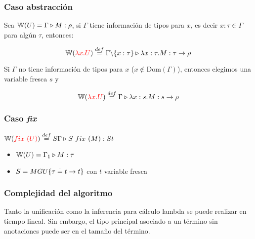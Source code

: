 \subsubsection{Caso abstracción}
Sea $\mathbb{W}(U) = \Gamma\triangleright M : \rho$, si $\Gamma$ tiene información de tipos para $x$, es decir $x:\tau\in\Gamma$ para algún $\tau$, entonces:

$$\mathbb{W}({\color{red}\lambda x. U}) \overset{def}{=} \Gamma \backslash\{x:\tau\}\triangleright \lambda x: \tau . M : \tau\to\rho$$

Si $\Gamma$ no tiene información de tipos para $x$ ($x\notin \text{Dom}(\Gamma)$), entonces elegimos una variable fresca $s$ y

$$\mathbb{W}({\color{red}\lambda x. U}) \overset{def}{=} \Gamma\triangleright \lambda x: s . M : s\to\rho$$

\subsubsection{Caso \textit{fix}}
$\mathbb{W}({\color{red}fix~(U)}) \overset{def}{=} S\Gamma\triangleright S~fix~(M) : St$
\begin{centrado}
\begin{itemize}
\item $\mathbb{W}(U) = \Gamma_1\triangleright M : \tau$
\item $S = MGU\{\tau\overset{\cdot}{=} t\to t\}$ con $t$ variable fresca
\end{itemize}
\end{centrado}

\subsubsection{Complejidad del algoritmo}
Tanto la unificación como la inferencia para cálculo lambda se puede realizar en tiempo lineal. Sin embargo, el tipo principal asociado a un término sin anotaciones puede ser  en el tamaño del término.
